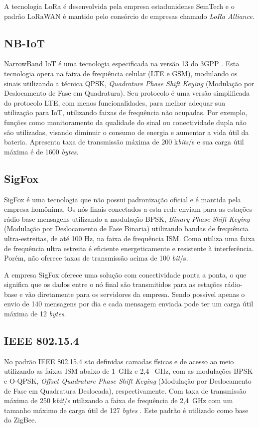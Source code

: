 A tecnologia LoRa é desenvolvida pela empresa estadunidense SemTech e o padrão LoRaWAN é mantido pelo consórcio de empresas chamado \emph{LoRa Alliance}.

\subsection{NB-IoT}
NarrowBand IoT é uma tecnologia especificada na versão 13 do 3GPP \cite{nbIoT}. Esta tecnologia opera na faixa de frequência celular (LTE e GSM), modulando os sinais utilizando a técnica QPSK, \emph{Quadrature Phase Shift Keying} (Modulação por Deslocamento de Fase em Quadratura). Seu protocolo é uma versão simplificada do protocolo LTE, com menos funcionalidades, para melhor adequar sua utilização para IoT, utilizando faixas de frequência não ocupadas. Por exemplo, funções como monitoramento da qualidade do sinal ou conectividade dupla não são utilizadas, visando diminuir o consumo de energia e aumentar a vida útil da bateria. Apresenta taxa de transmissão máxima de 200 k\emph{bits}/s e sua carga útil máxima é de 1600 \emph{bytes}.

\subsection{SigFox}
SigFox é uma tecnologia que não possui padronização oficial e é mantida pela empresa homônima. Os nós finais conectados a esta rede enviam para as estações rádio base mensagens utilizando a modulação BPSK, \emph{Binary Phase Shift Keying} (Modulação por Deslocamento de Fase Binaria) utilizando bandas de frequência ultra-estreitas, de até 100 Hz, na faixa de frequência ISM. Como utiliza uma faixa de frequência ultra estreita é eficiente energeticamente e resistente à interferência. Porém, não oferece taxas de transmissão acima de 100 \emph{bit}/s.

A empresa SigFox oferece uma solução com conectividade ponta a ponta, o que significa que os dados entre o nó final são transmitidos para as estações rádio-base e vão diretamente para os servidores da empresa. Sendo possível apenas o envio de 140 mensagens por dia e cada mensagem enviada pode ter um carga útil máxima de 12 \emph{bytes}.

\subsection{IEEE 802.15.4}
No padrão IEEE 802.15.4 são definidas camadas físicas e de acesso ao meio utilizando as faixas ISM abaixo de 1~GHz e 2,4 ~GHz, com as modulações BPSK e O-QPSK, \emph{Offset Quadrature Phase Shift Keying} (Modulação por Deslocamento de Fase em Quadratura Deslocada), respectivamente. Com taxa de transmissão máxima de 250 k\emph{bit}/s utilizando a faixa de frequência de 2,4~GHz com um tamanho máximo de carga útil de 127 \emph{bytes} \cite{munoz2018overview} \cite{gomes2017estimaccao}. Este padrão é utilizado como base do ZigBee.

